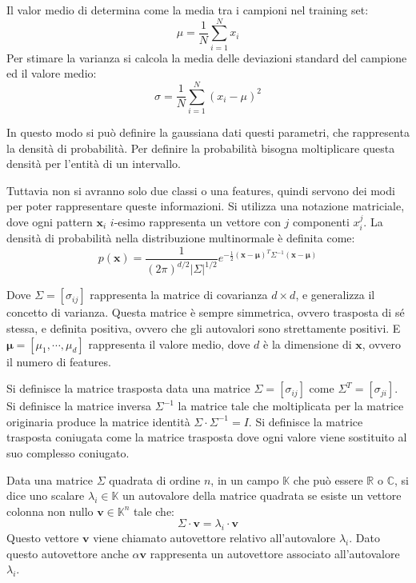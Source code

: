 \documentclass{article}
\numberwithin{equation}{subsection}
\newcommand{\vect}[1]{\boldsymbol{\mathbf{#1}}}
\begin{document}
Il valor medio di determina come la media tra i campioni nel training set:
\begin{equation*}
    \mu=\displaystyle\frac{1}{N}\sum_{i=1}^Nx_i
\end{equation*} 
Per stimare la varianza si calcola la media delle deviazioni standard del campione ed il valore medio:
\begin{equation*}
    \sigma=\displaystyle\frac{1}{N}\sum_{i=1}^N(x_i-\mu)^2
\end{equation*}

In questo modo si può definire la gaussiana dati questi parametri, che rappresenta la densità di probabilità. Per definire la probabilità bisogna moltiplicare questa densità per l'entità di un intervallo. 

Tuttavia non si avranno solo due classi o una features, quindi servono dei modi per poter rappresentare queste informazioni. Si utilizza una notazione matriciale, dove ogni pattern $\vect{x}_i$ $i$-esimo rappresenta un vettore con $j$ componenti $x_i^j$. La densità di probabilità nella distribuzione multinormale è definita come:
\begin{equation}
    p(\vect{x})=\displaystyle\frac{1}{(2\pi)^{d/2}{|\Sigma|}^{1/2}}e^{-\frac{1}{2}(\vect{x}-\vect{\mu})^T\Sigma^{-1}(\vect{x}-\vect{\mu})}
\end{equation}

Dove $\Sigma=[\sigma_{ij}]$ rappresenta la matrice di covarianza $d\times d$, e generalizza il concetto di varianza. Questa matrice è sempre simmetrica, ovvero trasposta di sé stessa, e definita positiva, ovvero che gli autovalori sono strettamente positivi. E $\vect{\mu}=[\mu_1,\cdots,\mu_d]$ rappresenta il valore medio, dove $d$ è la dimensione di $\vect{x}$, ovvero il numero di features. 

Si definisce la matrice trasposta data una matrice $\Sigma=[\sigma_{ij}]$ come $\Sigma^T=[\sigma_{ji}]$. Si definisce la matrice inversa $\Sigma^{-1}$ la matrice tale che moltiplicata per la matrice originaria produce la matrice identità $\Sigma\cdot\Sigma^{-1}=I$. Si definisce la matrice trasposta coniugata come la matrice trasposta dove ogni valore viene sostituito al suo complesso coniugato. 

Data una matrice $\Sigma$ quadrata di ordine $n$, in un campo $\mathbb{K}$ che può essere $\mathbb{R}$ o $\mathbb{C}$, si dice uno scalare $\lambda_i\in\mathbb{K}$ un autovalore della matrice quadrata se esiste un vettore colonna non nullo $\vect{v}\in\mathbb{K}^n$ tale che:
\begin{equation*}
    \Sigma\cdot\vect{v}=\lambda_i\cdot\vect{v}
\end{equation*}
Questo vettore $\vect{v}$ viene chiamato autovettore relativo all'autovalore $\lambda_i$. 
Dato questo autovettore anche $\alpha\vect{v}$ rappresenta un autovettore associato all'autovalore $\lambda_i$. 
\end{document}
